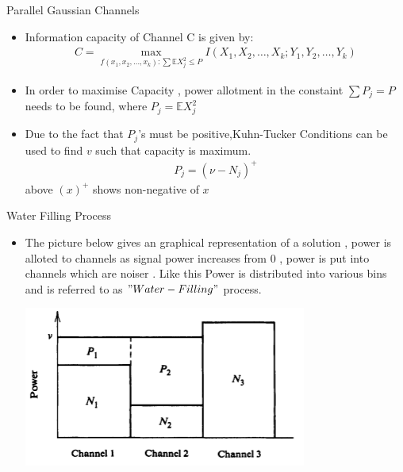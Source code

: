 \documentclass{beamer}
\begin{document}
\begin{frame}{Parallel Gaussian Channels}
 \begin{itemize}
	\justifying
\item Information capacity of Channel C is given by:
%
\begin{eqnarray}
    C = \max_{f(x_1, x_2, \dots, x_k) : \sum \mathbb{E} X_j^2 \leq P} I(X_1, X_2, \dots, X_k ; Y_1, Y_2, \dots, Y_k)
\end{eqnarray}
\item In order to maximise Capacity , power allotment in the constaint \( \sum P_j = P \) needs to be found, where \( P_j = \mathbb{E} X_j^2 \) 
\item Due to the fact that \( P_j \)'s must be positive,Kuhn-Tucker Conditions can be used to find $v$ such that capacity is maximum.
%
\begin{eqnarray}
    P_j = (\nu - N_j)^+
\end{eqnarray}
%
above $(x)^+$ shows non-negative of $x$ 


	\end{itemize}
\end{frame}
\begin{frame}{Water Filling Process}
 \begin{itemize}
	\justifying
\item The picture below gives an graphical representation of a solution , power is alloted to channels as signal power increases from 0 , power is put into channels which are noiser . Like this Power is distributed into various bins and is referred to as $"Water-Filling"$ process.
\begin{center}
	\includegraphics[scale=0.5]{Diagrams/parallel_guassian_channels_solution.png}
\end{center} 


	\end{itemize}
\end{frame}
\end{document}
